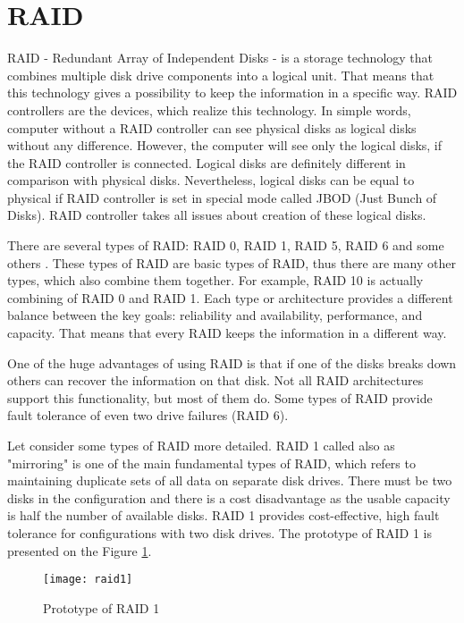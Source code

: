 \newpage
\section{RAID}
RAID - Redundant Array of Independent Disks - is a storage technology that combines multiple disk drive components into a logical unit. That means that this technology gives a possibility to keep the information in a specific way. RAID controllers are the devices, which realize this technology. In simple words, computer without a RAID controller can see physical disks as logical disks without any difference. However, the computer will see only the logical disks, if the RAID controller is connected. Logical disks are definitely different in comparison with physical disks. Nevertheless, logical disks can be equal to physical if RAID controller is set in special mode called JBOD (Just Bunch of Disks). RAID controller takes all issues about creation of these logical disks.

There are several types of RAID: RAID 0, RAID 1, RAID 5, RAID 6 and some others \cite{which_raid}. These types of RAID are basic types of RAID, thus there are many other types, which also combine them together. For example, RAID 10 is actually combining of RAID 0 and RAID 1. Each type or architecture provides a different balance between the key goals: reliability and availability, performance, and capacity. That means that every RAID keeps the information in a different way. 

One of the huge advantages of using RAID is that if one of the disks breaks down others can recover the information on that disk. Not all RAID architectures support this functionality, but most of them do. Some types of RAID provide fault tolerance of even two drive failures (RAID 6).

Let consider some types of RAID more detailed. RAID 1 called also as "mirroring" is one of the main fundamental types of RAID, which refers to maintaining duplicate sets of all data on separate disk drives. There must be two disks in the configuration and there is a cost disadvantage as the usable capacity is half the number of available disks. RAID 1 provides cost-effective, high fault tolerance for configurations with two disk drives. The prototype of RAID 1 is presented on the Figure \ref{fig:raid1}.
\begin{figure}[h!]
\begin{center}
  \texttt{[image: raid1]}
\end{center}
  \caption{Prototype of RAID 1}
  \label{fig:raid1}
\end{figure}

